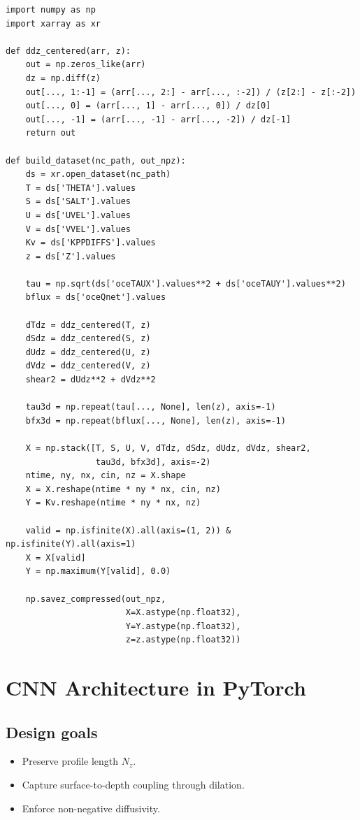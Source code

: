 \documentclass[11pt, a4paper]{article}
\begin{document}
\begin{verbatim}
import numpy as np
import xarray as xr

def ddz_centered(arr, z):
    out = np.zeros_like(arr)
    dz = np.diff(z)
    out[..., 1:-1] = (arr[..., 2:] - arr[..., :-2]) / (z[2:] - z[:-2])
    out[..., 0] = (arr[..., 1] - arr[..., 0]) / dz[0]
    out[..., -1] = (arr[..., -1] - arr[..., -2]) / dz[-1]
    return out

def build_dataset(nc_path, out_npz):
    ds = xr.open_dataset(nc_path)
    T = ds['THETA'].values
    S = ds['SALT'].values
    U = ds['UVEL'].values
    V = ds['VVEL'].values
    Kv = ds['KPPDIFFS'].values
    z = ds['Z'].values

    tau = np.sqrt(ds['oceTAUX'].values**2 + ds['oceTAUY'].values**2)
    bflux = ds['oceQnet'].values

    dTdz = ddz_centered(T, z)
    dSdz = ddz_centered(S, z)
    dUdz = ddz_centered(U, z)
    dVdz = ddz_centered(V, z)
    shear2 = dUdz**2 + dVdz**2

    tau3d = np.repeat(tau[..., None], len(z), axis=-1)
    bfx3d = np.repeat(bflux[..., None], len(z), axis=-1)

    X = np.stack([T, S, U, V, dTdz, dSdz, dUdz, dVdz, shear2,
                  tau3d, bfx3d], axis=-2)
    ntime, ny, nx, cin, nz = X.shape
    X = X.reshape(ntime * ny * nx, cin, nz)
    Y = Kv.reshape(ntime * ny * nx, nz)

    valid = np.isfinite(X).all(axis=(1, 2)) & np.isfinite(Y).all(axis=1)
    X = X[valid]
    Y = np.maximum(Y[valid], 0.0)

    np.savez_compressed(out_npz,
                        X=X.astype(np.float32),
                        Y=Y.astype(np.float32),
                        z=z.astype(np.float32))
\end{verbatim}

\section{CNN Architecture in PyTorch}

\subsection{Design goals}
\begin{itemize}
    \item Preserve profile length $N_z$.
    \item Capture surface-to-depth coupling through dilation.
    \item Enforce non-negative diffusivity.
\end{itemize}
\end{document}
